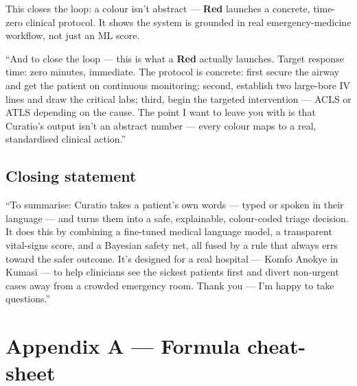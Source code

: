 \documentclass[11pt]{article}
\newcommand{\chip}[2]{\textcolor{#1}{\textbf{#2}}}
\begin{document}
\begin{idea}
This closes the loop: a colour isn't abstract --- \chip{satRed}{Red} launches a concrete, time-zero
clinical protocol. It shows the system is grounded in real emergency-medicine workflow, not just an ML
score.
\end{idea}

\begin{saybox}
``And to close the loop --- this is what a \chip{satRed}{Red} actually launches. Target response time: zero
minutes, immediate. The protocol is concrete: first secure the airway and get the patient on continuous
monitoring; second, establish two large-bore IV lines and draw the critical labs; third, begin the
targeted intervention --- ACLS or ATLS depending on the cause. The point I want to leave you with is that
Curatio's output isn't an abstract number --- every colour maps to a real, standardised clinical action.''
\end{saybox}

\subsection*{Closing statement}
\begin{saybox}
``To summarise: Curatio takes a patient's own words --- typed or spoken in their language --- and turns
them into a safe, explainable, colour-coded triage decision. It does this by combining a fine-tuned medical
language model, a transparent vital-signs score, and a Bayesian safety net, all fused by a rule that always
errs toward the safer outcome. It's designed for a real hospital --- Komfo Anokye in Kumasi --- to help
clinicians see the sickest patients first and divert non-urgent cases away from a crowded emergency room.
Thank you --- I'm happy to take questions.''
\end{saybox}

\section{Appendix A --- Formula cheat-sheet}
\end{document}
